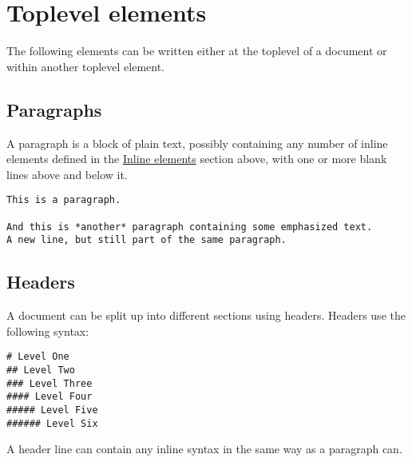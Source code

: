 \hypertarget{1299449328577314863}{}


\section{Toplevel elements}



The following elements can be written either at the {\textquotedbl}toplevel{\textquotedbl} of a document or within another {\textquotedbl}toplevel{\textquotedbl} element.



\hypertarget{7653906193491884111}{}


\subsection{Paragraphs}



A paragraph is a block of plain text, possibly containing any number of inline elements defined in the \hyperlink{17997341109973101587}{Inline elements} section above, with one or more blank lines above and below it.




\begin{lstlisting}
This is a paragraph.

And this is *another* paragraph containing some emphasized text.
A new line, but still part of the same paragraph.
\end{lstlisting}



\hypertarget{14939650886219602329}{}


\subsection{Headers}



A document can be split up into different sections using headers. Headers use the following syntax:




\begin{verbatim}
# Level One
## Level Two
### Level Three
#### Level Four
##### Level Five
###### Level Six
\end{verbatim}



A header line can contain any inline syntax in the same way as a paragraph can.



